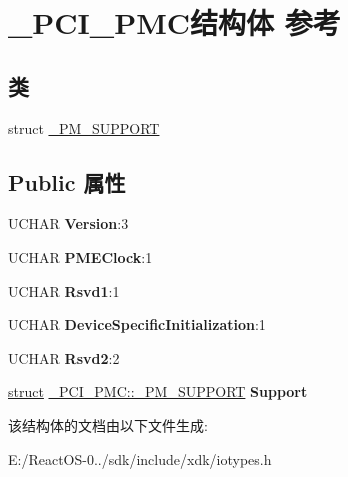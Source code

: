 \hypertarget{struct___p_c_i___p_m_c}{}\section{\+\_\+\+P\+C\+I\+\_\+\+P\+M\+C结构体 参考}
\label{struct___p_c_i___p_m_c}
\subsection*{类}
\begin{DoxyCompactItemize}
\item 
struct \hyperlink{struct___p_c_i___p_m_c_1_1___p_m___s_u_p_p_o_r_t}{\+\_\+\+P\+M\+\_\+\+S\+U\+P\+P\+O\+RT}
\end{DoxyCompactItemize}
\subsection*{Public 属性}
\begin{DoxyCompactItemize}
\item 
\mbox{\label{struct___p_c_i___p_m_c_a4844564fe848edd1e2caf58de8e61d4b}} 
U\+C\+H\+AR {\bfseries Version}\+:3
\item 
\mbox{\label{struct___p_c_i___p_m_c_ae98ab9ac209da7a929150f4205083d3f}} 
U\+C\+H\+AR {\bfseries P\+M\+E\+Clock}\+:1
\item 
\mbox{\label{struct___p_c_i___p_m_c_ac93511e14e50d5fdc0e23e45cd79398e}} 
U\+C\+H\+AR {\bfseries Rsvd1}\+:1
\item 
\mbox{\label{struct___p_c_i___p_m_c_a9d63758b4be9e8e8396a5ce05ccb9b7f}} 
U\+C\+H\+AR {\bfseries Device\+Specific\+Initialization}\+:1
\item 
\mbox{\label{struct___p_c_i___p_m_c_aaa539e4d3291f5fd95f4a5f86a7b6e55}} 
U\+C\+H\+AR {\bfseries Rsvd2}\+:2
\item 
\mbox{\label{struct___p_c_i___p_m_c_aaae4e738785127585a708b8a250eb39c}} 
\hyperlink{interfacestruct}{struct} \hyperlink{struct___p_c_i___p_m_c_1_1___p_m___s_u_p_p_o_r_t}{\+\_\+\+P\+C\+I\+\_\+\+P\+M\+C\+::\+\_\+\+P\+M\+\_\+\+S\+U\+P\+P\+O\+RT} {\bfseries Support}
\end{DoxyCompactItemize}


该结构体的文档由以下文件生成\+:\begin{DoxyCompactItemize}
\item 
E\+:/\+React\+O\+S-\/0../sdk/include/xdk/iotypes.\+h\end{DoxyCompactItemize}

